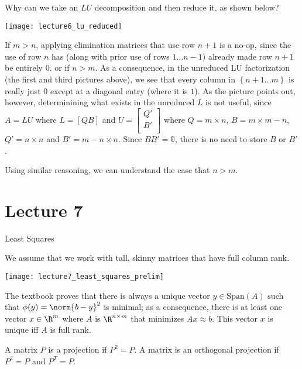 \documentclass[../main.tex]{subfiles}
\begin{document}
\begin{remark}
    Why can we take an $LU$ decomposition and then reduce it, as shown below?
    \begin{center}
        \texttt{[image: lecture6\_lu\_reduced]}
    \end{center}

    If $m > n$, applying elimination matrices that use row $n+1$ is a no-op, since the use of row $n$ has (along with prior use of rows $1 \dots n-1$) already made row $n+1$ be entirely $0$. or if $n > m$. As a consequence, in the unreduced LU factorization (the first and third pictures above), we see that every column in $\left\{ n+1 \dots m \right\}$ is really just $0$ except at a diagonal entry (where it is $1$). As the picture points out, however, determinining what exists in the unreduced $L$ is not useful, since $A = LU$ where $L = [Q B]$ and $U = \begin{bmatrix}
        Q' \\
        B' \\
    \end{bmatrix}$ where $Q = m \times n$, $B = m \times m-n$, $Q' = n \times n$ and $B' = m -n \times n$. Since $BB' = \mathbb{0}$, there is no need to store $B$ or $B'$.

    Using similar reasoning, we can understand the case that $n > m$.
\end{remark}

\section{Lecture 7}{Least Squares}
\begin{remark}
    We assume that we work with tall, skinny matrices that have full column rank.
\end{remark}
\begin{remark}
    \begin{center}
        \texttt{[image: lecture7\_least\_squares\_prelim]}
    \end{center}
    The textbook proves that there is always a unique vector $y \in \text{Span}(A)$ such that $\phi(y) = \norm{b - y}^2$ is minimal; as a consequence, there is at least one vector $x \in \R^m$ where $A$ is $\R^{n \times m}$ that minimizes $Ax \approx b$. This vector $x$ is unique iff $A$ is full rank.
\end{remark}

\begin{definition}
    A matrix $P$ is a projection if $P^2 = P$. A matrix is an orthogonal projection if $P^2 = P$ and $P^T = P$.
\end{definition}
\end{document}
